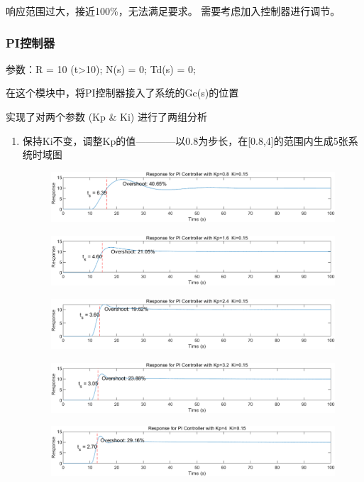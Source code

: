 \documentclass{thuemp}
\begin{document}
响应范围过大，接近100\%，无法满足要求。
需要考虑加入控制器进行调节。

\subsubsection{PI控制器}
参数：R = 10 (t>10);  N(s) = 0;  Td(s) = 0;

在这个模块中，将PI控制器接入了系统的Gc(s)的位置

实现了对两个参数 (Kp \& Ki) 进行了两组分析
\begin{enumerate}
  \item 保持Ki不变，调整Kp的值————以0.8为步长，在[0.8,4]的范围内生成5张系统时域图
  \begin{figure}[H]
    \centering
    \includegraphics[width=1\linewidth]{./img/PI/i1.png}
  \end{figure}
  \begin{figure}[H]
    \centering
    \includegraphics[width=1\linewidth]{./img/PI/i2.png}
  \end{figure}
  \begin{figure}[H]
    \centering
    \includegraphics[width=1\linewidth]{./img/PI/i3.png}
  \end{figure}
  \begin{figure}[H]
    \centering
    \includegraphics[width=1\linewidth]{./img/PI/i4.png}
  \end{figure}
  \begin{figure}[H]
    \centering
    \includegraphics[width=1\linewidth]{./img/PI/i5.png}
  \end{figure}


\end{enumerate}
\end{document}
